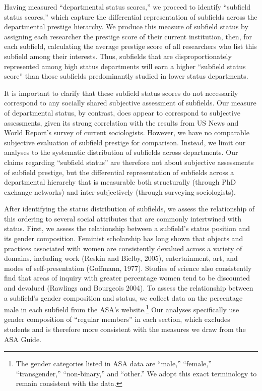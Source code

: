 \documentclass{article}
\begin{document}
Having measured ``departmental status scores,'' we proceed to identify
``subfield status scores,'' which capture the differential
representation of subfields across the departmental prestige hierarchy.
We produce this measure of subfield status by assigning each researcher
the prestige score of their current institution, then, for each
subfield, calculating the average prestige score of all researchers who
list this subfield among their interests. Thus, subfields that are
disproportionately represented among high status departments will earn a
higher ``subfield status score'' than those subfields predominantly
studied in lower status departments.

It is important to clarify that these subfield status scores do not
necessarily correspond to any socially shared subjective assessment of
subfields. Our measure of departmental status, by contrast, does appear
to correspond to subjective assessments, given its strong correlation
with the results from US News and World Report's survey of current
sociologists. However, we have no comparable subjective evaluation of
subfield prestige for comparison. Instead, we limit our analyses to the
systematic distribution of subfields across departments. Our claims
regarding ``subfield status'' are therefore not about subjective
assessments of subfield prestige, but the differential representation of
subfields across a departmental hierarchy that is measurable both
structurally (through PhD exchange networks) and inter-subjectively
(through surveying sociologists).

After identifying the status distribution of subfields, we assess the
relationship of this ordering to several social attributes that are
commonly intertwined with status. First, we assess the relationship
between a subfield's status position and its gender composition.
Feminist scholarship has long shown that objects and practices
associated with women are consistently devalued across a variety of
domains, including work (Reskin and Bielby, 2005), entertainment, art,
and modes of self-presentation (Goffmann, 1977). Studies of science also
consistently find that areas of inquiry with greater percentage women
tend to be discounted and devalued (Rawlings and Bourgeois 2004). To
assess the relationship between a subfield's gender composition and
status, we collect data on the percentage male in each subfield from the
ASA's website.\footnote{The gender categories listed in ASA data are
  ``male,'' ``female,'' ``transgender,'' ``non-binary,'' and ``other.''
  We adopt this exact terminology to remain consistent with the data.}
Our analyses specifically use gender composition of ``regular members''
in each section, which excludes students and is therefore more
consistent with the measures we draw from the ASA Guide.
\end{document}
